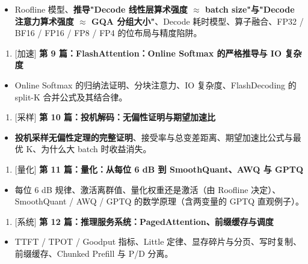 \begin{itemize}
  \item Roofline 模型、\textbf{推导"Decode 线性层算术强度 $\approx$ batch size"与"Decode 注意力算术强度 $\approx$ GQA 分组大小"}、Decode 耗时模型、算子融合、FP32 / BF16 / FP16 / FP8 / FP4 的位布局与精度陷阱。
\end{itemize}

\begin{enumerate}
  \item {}[加速] \textbf{\textbf{第 9 篇：FlashAttention：Online Softmax 的严格推导与 IO 复杂度}}
\end{enumerate}

\begin{itemize}
  \item Online Softmax 的归纳法证明、分块注意力、IO 复杂度、FlashDecoding 的 split-K 合并公式及其结合律。
\end{itemize}

\begin{enumerate}
  \item {}[采样] \textbf{\textbf{第 10 篇：投机解码：无偏性证明与期望加速比}}
\end{enumerate}

\begin{itemize}
  \item \textbf{投机采样无偏性定理的完整证明}、接受率与总变差距离、期望加速比公式与最优 K、为什么大 batch 时收益消失。
\end{itemize}

\begin{enumerate}
  \item {}[量化] \textbf{\textbf{第 11 篇：量化：从每位 6 dB 到 SmoothQuant、AWQ 与 GPTQ}}
\end{enumerate}

\begin{itemize}
  \item 每位 6 dB 规律、激活离群值、量化权重还是激活（由 Roofline 决定）、SmoothQuant / AWQ / GPTQ 的数学原理（含两变量的 GPTQ 直观例子）。
\end{itemize}

\begin{enumerate}
  \item {}[系统] \textbf{\textbf{第 12 篇：推理服务系统：PagedAttention、前缀缓存与调度}}
\end{enumerate}

\begin{itemize}
  \item TTFT / TPOT / Goodput 指标、Little 定律、显存碎片与分页、写时复制、前缀缓存、Chunked Prefill 与 P/D 分离。
\end{itemize}

